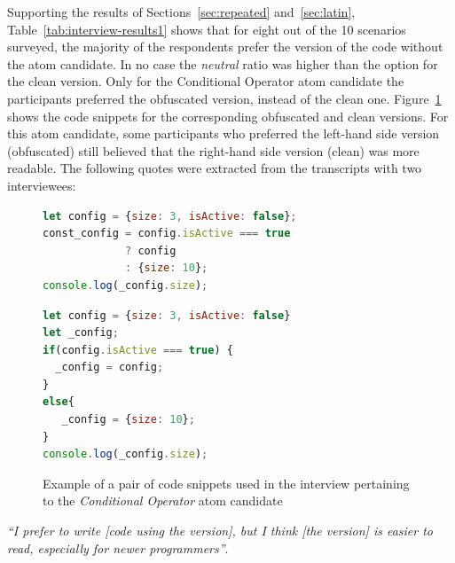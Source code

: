 Supporting the results of Sections~\ref{sec:repeated} and~\ref{sec:latin}, Table~\ref{tab:interview-results1}
 shows that for eight out of the
10 scenarios surveyed, the majority of the respondents prefer the version of the
code without the atom candidate.
In no case the \emph{neutral}
ratio was higher than the option for the clean version.
Only for the Conditional Operator atom candidate the participants preferred the obfuscated version, instead of the clean one. Figure~\ref{code:ternary} shows the code snippets for the corresponding obfuscated and clean versions. For this atom candidate, some participants who preferred the left-hand side version (obfuscated) still believed that the right-hand side version (clean) was more readable. The following quotes were extracted from the transcripts with
two interviewees:

\begin{figure}

\noindent\begin{minipage}{.45\textwidth}
\begin{lstlisting}[language=JavaScript, caption=\emph{Left-hand side} (using the \emph{Conditional Operator} atom).]
let config = {size: 3, isActive: false};
const_config = config.isActive === true 
             ? config 
             : {size: 10};
console.log(_config.size);
\end{lstlisting}
\end{minipage}\hfill
\begin{minipage}{.45\textwidth}
\begin{lstlisting}[language=JavaScript, caption=\emph{Right-hand side} (without the atom).]
let config = {size: 3, isActive: false}
let _config;
if(config.isActive === true) {
  _config = config;
}
else{
   _config = {size: 10};
}
console.log(_config.size);
\end{lstlisting}
\end{minipage}
\caption{Example of a pair of code snippets used in the interview pertaining to the \emph{Conditional Operator} atom candidate}
\label{code:ternary}
\vspace{-0.2cm}
\end{figure}

\begin{mq}
\emph{``I prefer to write [code using the \lhs version], but I think [the \rhs version] is easier to read, especially for newer programmers''}.
\end{mq}

